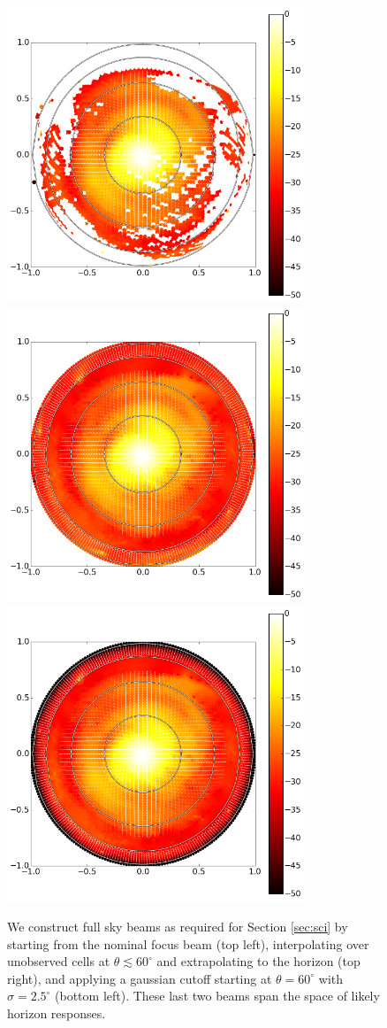 \documentclass[preprint]{aastex}
\begin{document}
\begin{figure}[h]
\includegraphics[width=3.5in]{measbeam_raw.png}
\includegraphics[width=3.5in]{measbeam_interp.png}
\includegraphics[width=3.5in]{measbeam_interp_expcutoff.png}
\caption{We construct full sky beams as required for Section \ref{sec:sci} by starting from the nominal focus beam (top left), interpolating over unobserved cells at $\theta\lesssim60^\circ$ and extrapolating to the horizon (top right), and applying a gaussian cutoff starting at $\theta=60^\circ$ with $\sigma=2.5^\circ$ (bottom left). These last two beams span the space of likely horizon responses.}
\label{fig:interpbeams}
\end{figure}
\end{document}
